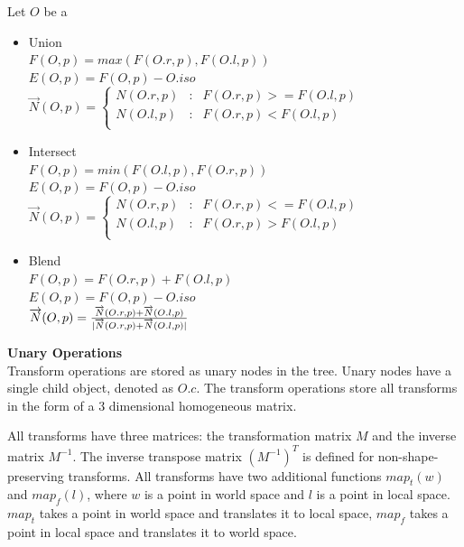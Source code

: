 \documentclass[conference]{acmsiggraph}
\begin{document}
Let $O$ be a
\begin{itemize}
	\item Union\\
		$F(O, p) = max(F(O.r, p), F(O.l, p))$\\
		$E(O, p) = F(O, p) - O.iso$\\
		$
		\overrightarrow{N}(O, p) = \left\{
			\begin{array}{lcl}
				N(O.r, p) & : &  F(O.r, p) >= F(O.l, p)\\
				N(O.l, p) & : &  F(O.r, p) <  F(O.l, p)\\
			\end{array}
		\right.
		$
	\item Intersect\\
		$F(O, p) = min(F(O.l, p), F(O.r, p))$\\
		$E(O, p) = F(O, p) - O.iso$\\
		$
		\overrightarrow{N}(O, p) = \left\{
			\begin{array}{lcl}
				N(O.r, p) & : &  F(O.r, p) <= F(O.l, p)\\
				N(O.l, p) & : &  F(O.r, p) >  F(O.l, p)\\
			\end{array}
		\right.
		$
	\item Blend\\
		$F(O, p) = F(O.r, p) + F(O.l, p)$\\
		$E(O, p) = F(O, p) - O.iso$\\
		$\overrightarrow{N}(O, p) = {\overrightarrow{N}(O.r, p) +
		\overrightarrow{N}(O.l, p) \over \lvert \overrightarrow{N}(O.r,
		p) + \overrightarrow{N}(O.l, p)
		\rvert}$\\
\end{itemize}

\textbf{Unary Operations}\\
Transform operations are stored as unary nodes in the tree. Unary nodes have
a single child object, denoted as $O.c$. The transform operations store all
transforms in the form of a 3 dimensional homogeneous matrix.

All transforms have three matrices: the transformation matrix $M$ and the inverse
matrix $M^{-1}$. The inverse transpose matrix $(M^{-1})^T$ is defined for
non-shape-preserving transforms. All transforms have two additional functions
$map_t(w)$ and $map_f(l)$, where $w$ is a point in world space and $l$ is a
point in local space. $map_t$ takes a point in world space and translates it to
local space, $map_f$ takes a point in local space and translates it to world
space.
\end{document}
